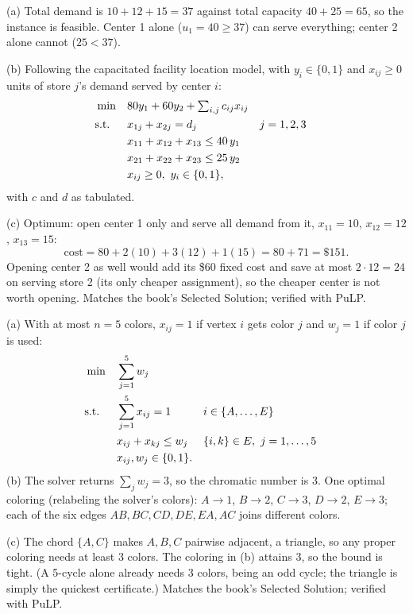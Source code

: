 
(a) Total demand is $10+12+15 = 37$ against total capacity $40+25 = 65$, so the instance is feasible. Center 1 alone ($u_1 = 40 \geq 37$) can serve everything; center 2 alone cannot ($25 < 37$).

(b) Following the capacitated facility location model, with $y_i \in \{0,1\}$ and $x_{ij} \geq 0$ units of store $j$'s demand served by center $i$:
\[
\begin{aligned}
\min\quad & 80y_1 + 60y_2 + \textstyle\sum_{i,j} c_{ij}x_{ij}\\
\text{s.t.}\;\;\quad & x_{1j} + x_{2j} = d_j && j = 1,2,3\\
& x_{11} + x_{12} + x_{13} \leq 40\,y_1\\
& x_{21} + x_{22} + x_{23} \leq 25\,y_2\\
& x_{ij} \geq 0,\ y_i \in \{0,1\},
\end{aligned}
\]
with $c$ and $d$ as tabulated.

(c) Optimum: open center 1 only and serve all demand from it, $x_{11} = 10$, $x_{12} = 12$, $x_{13} = 15$:
\[
\text{cost} = 80 + 2(10) + 3(12) + 1(15) = 80 + 71 = \$151.
\]
Opening center 2 as well would add its \$60 fixed cost and save at most $2 \cdot 12 = 24$ on serving store 2 (its only cheaper assignment), so the cheaper center is not worth opening. Matches the book's Selected Solution; verified with PuLP.


(a) With at most $n = 5$ colors, $x_{ij} = 1$ if vertex $i$ gets color $j$ and $w_j = 1$ if color $j$ is used:
\[
\begin{aligned}
\min\quad & \sum_{j=1}^{5} w_j\\
\text{s.t.}\;\;\quad & \sum_{j=1}^{5} x_{ij} = 1 && i \in \{A,\dots,E\}\\
& x_{ij} + x_{kj} \leq w_j && \{i,k\} \in E,\ j = 1,\dots,5\\
& x_{ij}, w_j \in \{0,1\}.
\end{aligned}
\]
(b) The solver returns $\sum_j w_j = 3$, so the chromatic number is 3. One optimal coloring (relabeling the solver's colors): $A \to 1$, $B \to 2$, $C \to 3$, $D \to 2$, $E \to 3$; each of the six edges $AB, BC, CD, DE, EA, AC$ joins different colors.

(c) The chord $\{A,C\}$ makes $A, B, C$ pairwise adjacent, a triangle, so any proper coloring needs at least 3 colors. The coloring in (b) attains 3, so the bound is tight. (A 5-cycle alone already needs 3 colors, being an odd cycle; the triangle is simply the quickest certificate.) Matches the book's Selected Solution; verified with PuLP.

